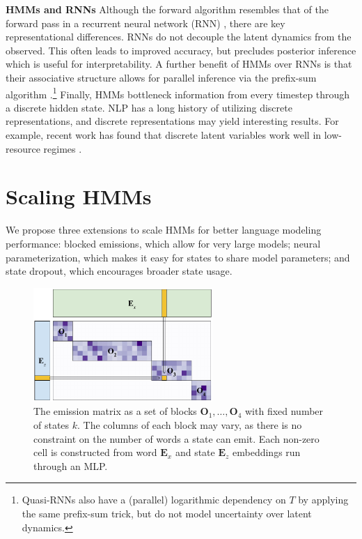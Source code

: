 \documentclass[11pt,a4paper]{article}
\begin{document}
\noindent \textbf{HMMs and RNNs}
Although the forward algorithm resembles that of the forward pass in a recurrent neural network (RNN)
\citep{buys2018hmm}, there are key representational differences.
RNNs do not decouple the latent dynamics from the observed.
This often leads to improved accuracy,
but precludes posterior inference which is useful for interpretability.
A further benefit of HMMs over RNNs is that
their associative structure allows for parallel inference
via the prefix-sum algorithm \cite{ladner1980prefix}.\footnote{
Quasi-RNNs \citep{bradbury2016qrnn} also have a (parallel) logarithmic dependency on $T$
by applying the same prefix-sum trick, but do not model uncertainty over
latent dynamics.}
Finally, HMMs bottleneck information from every timestep through a discrete hidden state. 
NLP has a long history of utilizing discrete representations,
and discrete representations may yield interesting results.
For example, recent work has found that discrete latent variables
work well in low-resource regimes \citep{jin2020discrete}.

\section{Scaling HMMs}
\label{sec:methods}

We propose three extensions to scale HMMs for better language modeling performance: blocked emissions, which allow for very large models; neural parameterization, which makes it easy for states to share model parameters; and state dropout, which encourages broader state usage. 

\begin{figure}[t]
\centering
\includegraphics[height=1.7in]{img/blocksparse_mat_no_block.pdf}
\caption{\label{fig:emit}
The emission matrix as a set of blocks $\mathbf{O}_1, \ldots, \mathbf{O}_4$
with fixed number of states $k$.
The columns of each block may vary, as there is no constraint on the number of words
a state can emit.
Each non-zero cell is constructed from word $\mathbf{E}_x$ and state $\mathbf{E}_z$
embeddings run through an MLP.
}
\end{figure}
\end{document}
